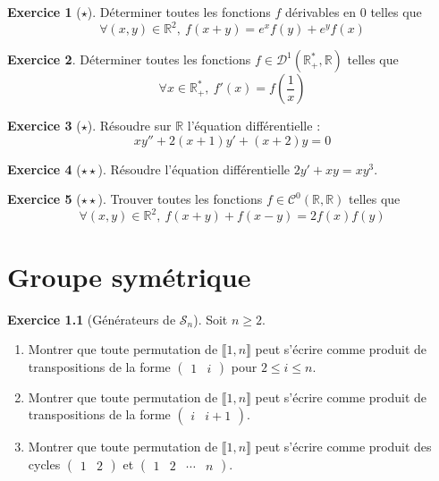 \documentclass[french]{book}
\newcommand{\R}{\mathbb{R}}
\newcommand{\st}{^*}
\theoremstyle{definition}
\newtheorem{ex}{Exercice}[chapter]
\theoremstyle{theorem}
\theoremstyle{remark}
\begin{document}
\begin{ex}[$\star$]
	Déterminer toutes les fonctions $f$ dérivables en $0$ telles que $$\forall (x,y)\in\R^2,\ f(x+y)=e^xf(y)+e^yf(x)$$
\end{ex}

\begin{ex}
	Déterminer toutes les fonctions $f\in\mathcal{D}^1(\R_+\st,\R)$ telles que $$\forall x\in\R_+\st,\ f'(x)=f\displaystyle\left(\frac{1}{x}\right)$$
\end{ex}

\begin{ex}[$\star$]
	Résoudre sur $\R$ l'équation différentielle : $$xy''+2(x+1)y'+(x+2)y=0$$
\end{ex}

\begin{ex}[$\star\star$]
	Résoudre l'équation différentielle $2y'+xy=xy^3$.
\end{ex}

\begin{ex}[$\star\star$]
	Trouver toutes les fonctions $f\in\mathcal{C}^0(\R,\R)$ telles que $$\forall (x,y)\in\R^2,\ f(x+y)+f(x-y)=2f(x)f(y)$$
\end{ex}


\chapter{Groupe symétrique}

\begin{ex}[Générateurs de $\mathcal{S}_n$]
	Soit $n\geqslant 2$.
	\begin{enumerate}
		\item Montrer que toute permutation de $\llbracket1,n\rrbracket$ peut s'écrire comme produit de transpositions de la forme $\begin{pmatrix}
			1&i
		\end{pmatrix}$ pour $2\leqslant i\leqslant n$.
		\item Montrer que toute permutation de $\llbracket1,n\rrbracket$ peut s'écrire comme produit de transpositions de la forme $\begin{pmatrix}
			i&i+1
		\end{pmatrix}$.
		\item Montrer que toute permutation de $\llbracket1,n\rrbracket$ peut s'écrire comme produit des cycles $\begin{pmatrix}
			1&2
		\end{pmatrix}$ et $\begin{pmatrix}
		1&2&\cdots&n
		\end{pmatrix}$.
	\end{enumerate}
\end{ex}
\end{document}
